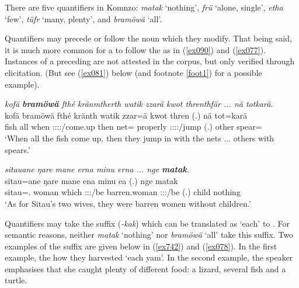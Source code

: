 There are five quantifiers in Komnzo: \emph{matak} `nothing', \emph{frü} `alone, single', \emph{etha} `few', \emph{tüfr} `many, plenty', and \emph{bramöwä} `all'.%

Quantifiers may precede or follow the noun which they modify. That being said, it is much more common for a  to follow the  as in (\ref{ex090}) and (\ref{ex077}). Instances of a preceding  are not attested in the corpus, but only verified through elicitation. (But see (\ref{ex081}) below (and footnote \ref{foot1}) for a possible example).

\begin{exe}
	\ex \emph{kofä \textbf{bramöwä} fthé kränmtherth watik zzarä kwot threnthfär ... nä totkarä.}\\
	\gll kofä bramöwä fthé kränth watik zzar=ä kwot thren (.) nä tot=karä\\
	fish all when \Stpl:\Sbj:\Irr:\Pfv:\Venit/come.up then net=\Assoc{} properly \Stpl:\Sbj:\Irr:\Pfv:\Venit{}/jump (.) other spear=\Prop{}\\
	\trans `When all the fish come up, then they jump in with the nets ... others with spears.' 
	\label{ex090}
\end{exe}
\begin{exe}
	\ex \emph{sitauane ŋare mane erna minu erna ... nge \textbf{matak}.}\\
	\gll sitau=ane ŋare mane ena {minu} ea (.) nge matak\\
	sitau=\Poss.\Sg{} woman which \Stdu:\Sbj:\Pst:\Ipfv{}/be {barren.woman} \Stdu:\Sbj:\Pst:\Ipfv/be (.) child nothing\\
	\trans `As for Sitau's two wives, they were barren women without children.'\\ 
	\label{ex077}
\end{exe}

Quantifiers may take the  suffix (\emph{-kak}) which can be translated as `each' to . For semantic reasons, neither \emph{matak} `nothing' nor \emph{bramöwä} `all' take this suffix. Two examples of the  suffix are given below in (\ref{ex742}) and (\ref{ex078}). In the first example, the how they harvested `each yam'. In the second example, the speaker emphasises that she caught plenty of different food: a lizard, several fish and a turtle.

